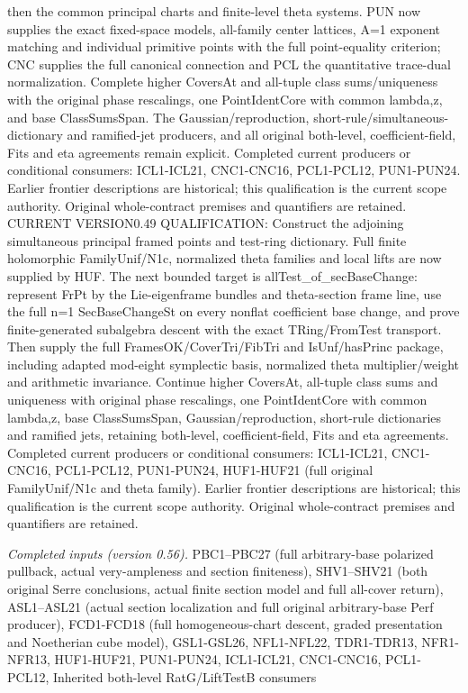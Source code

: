 \documentclass[11pt,a4paper]{article}
\numberwithin{equation}{section}
\theoremstyle{remark}\newtheorem{remark}[theorem]{Remark}
\begin{document}
then the common principal charts and finite-level theta systems. PUN now supplies the exact fixed-space models, all-family center lattices, A=1 exponent matching and individual primitive points with the full point-equality criterion; CNC supplies the full canonical connection and PCL the quantitative trace-dual normalization. Complete higher CoversAt and all-tuple class sums/uniqueness with the original phase rescalings, one PointIdentCore with common lambda,z, and base ClassSumsSpan. The Gaussian/reproduction, short-rule/simultaneous-dictionary and ramified-jet producers, and all original both-level, coefficient-field, Fits and eta agreements remain explicit. Completed current producers or conditional consumers: ICL1-ICL21, CNC1-CNC16, PCL1-PCL12, PUN1-PUN24. Earlier frontier descriptions are historical; this qualification is the current scope authority. Original whole-contract premises and quantifiers are retained. CURRENT VERSION0.49 QUALIFICATION: Construct the adjoining simultaneous principal framed points and test-ring dictionary. Full finite holomorphic FamilyUnif/N1c, normalized theta families and local lifts are now supplied by HUF. The next bounded target is allTest\_\allowbreak of\_\allowbreak secBaseChange: represent FrPt by the Lie-eigenframe bundles and theta-section frame line, use the full n=1 SecBaseChangeSt on every nonflat coefficient base change, and prove finite-generated subalgebra descent with the exact TRing/FromTest transport. Then supply the full FramesOK/CoverTri/FibTri and IsUnf/hasPrinc package, including adapted mod-eight symplectic basis, normalized theta multiplier/weight and arithmetic invariance. Continue higher CoversAt, all-tuple class sums and uniqueness with original phase rescalings, one PointIdentCore with common lambda,z, base ClassSumsSpan, Gaussian/reproduction, short-rule dictionaries and ramified jets, retaining both-level, coefficient-field, Fits and eta agreements. Completed current producers or conditional consumers: ICL1-ICL21, CNC1-CNC16, PCL1-PCL12, PUN1-PUN24, HUF1-HUF21 (full original FamilyUnif/N1c and theta family). Earlier frontier descriptions are historical; this qualification is the current scope authority. Original whole-contract premises and quantifiers are retained.

\emph{Completed inputs (version 0.56).} PBC1–PBC27 (full arbitrary-base polarized pullback, actual very-ampleness and section finiteness), SHV1–SHV21 (both original Serre conclusions, actual finite section model and full all-cover return), ASL1–ASL21 (actual section localization and full original arbitrary-base Perf producer), FCD1-FCD18 (full homogeneous-chart descent, graded presentation and Noetherian cube model), GSL1-GSL26, NFL1-NFL22, TDR1-TDR13, NFR1-NFR13, HUF1-HUF21, PUN1-PUN24, ICL1-ICL21, CNC1-CNC16, PCL1-PCL12, Inherited both-level RatG/LiftTestB consumers
\end{document}
